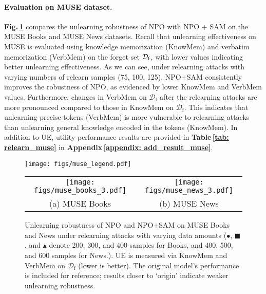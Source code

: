 \paragraph{{Evaluation on MUSE dataset.}} 
\textbf{Fig.\,\ref{fig: relearn_muse_npo}} compares the unlearning robustness of NPO with NPO + SAM on the MUSE Books and MUSE News datasets.
Recall that unlearning effectiveness on MUSE is evaluated using knowledge memorization (KnowMem) and verbatim memorization (VerbMem) on the forget set $\mathcal{D_{\mathrm{f}}}$, with lower values indicating better unlearning effectiveness.  
As we can see, under relearning attacks with varying numbers of relearn samples (75, 100, 125), NPO+SAM consistently improves the robustness of NPO, as evidenced by lower KnowMem and VerbMem values. Furthermore, changes in VerbMem on $\mathcal{D}_\mathrm{f}$ after the relearning attacks are more pronounced compared to those in KnowMem on $\mathcal{D}_\mathrm{f}$. This indicates that unlearning precise tokens (VerbMem) is more vulnerable to relearning attacks than unlearning general knowledge encoded in the tokens (KnowMem).
In addition to UE, utility performance results are provided in \textbf{Table\,\ref{tab: relearn_muse}} in \textbf{Appendix\,\ref{appendix: add_result_muse}}.

\begin{figure}[htb]
\vspace{-3.5mm}
\center
\hspace*{2mm}
\texttt{[image: figs/muse\_legend.pdf]}\\
\vspace{-1.3mm}
\begin{tabular}{cc}
\hspace*{-3mm}
\texttt{[image: figs/muse\_books\_3.pdf]} 
&
\texttt{[image: figs/muse\_news\_3.pdf]}
\vspace*{-1mm}
\\
\hspace*{3mm} \small{(a) MUSE Books} & \small{(b) MUSE News}\\
\end{tabular}
\vspace{-2mm}
\caption{\small{
Unlearning robustness of NPO and NPO+SAM on MUSE Books and News under relearning attacks with varying data amounts ($\bullet$, $\blacksquare$, and $\blacktriangle$ denote 200, 300, and 400 samples for Books, and 400, 500, and 600 samples for News.). UE is measured via KnowMem and VerbMem on $\mathcal{D}_\mathrm{f}$ (lower is better). The original model’s performance is included for reference; results closer to `origin' indicate weaker unlearning robustness.
}}
\label{fig: relearn_muse_npo}
\vspace*{-1mm}
\end{figure}

